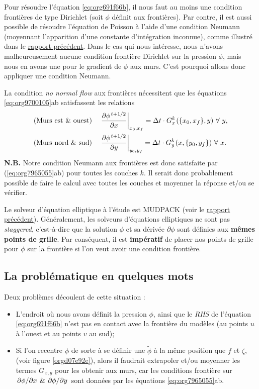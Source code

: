 \documentclass[10pt]{report}
\numberwithin{equation}{section}
\newcommand{\pt}{\hspace{1pt}} %
\begin{document}
Pour résoudre l'équation \ref{eq:org691f66b}, il nous faut au moins une condition frontières de type Dirichlet (soit \(\phi\) définit aux frontières).
Par contre, il est aussi possible de résoudre l'équation de Poisson à l'aide d'une condition Neumann (moyennant l'apparition d'une constante d'intégration inconnue), comme illustré dans le \href{rapport-2023-04-21.org}{rapport précédent}.
Dans le cas qui nous intéresse, nous n'avons malheureusement aucune condition frontière Dirichlet sur la pression \(\phi\), mais nous en avons une pour le gradient de \(\phi\) aux murs.
C'est pourquoi allons donc appliquer une condition Neumann.\bigskip

La condition \emph{no normal flow} aux frontières nécessitent que les équations \ref{eq:org9700105}ab satisfassent les relations
\begin{subequations}
\label{eq:org7965055}
\begin{align}
&& &\text{(Murs est \& ouest)}
&&\eval{\pdv{\phi^{\pt t+1/2}}{x}}_{x_0,x_f} =  \Delta t\cdot G^k_x\pt (\{x_0,x_f\},y)\ \forall\ y,&&\\
&& &\text{(Murs nord \& sud)}
&&\eval{\pdv{\phi^{\pt t+1/2}}{y}}_{y_0,y_f} =  \Delta t\cdot G^k_y\pt (x,\{y_0,y_f\})\ \forall\ x.&&
\end{align}
\end{subequations}
\textbf{N.B.} Notre condition Neumann aux frontières est donc satisfaite par (\ref{eq:org7965055}ab) pour toutes les couches \(k\).
Il serait donc probablement possible de faire le calcul avec toutes les couches et moyenner la réponse et/ou se vérifier.\bigskip

Le solveur d'équation elliptique à l'étude est MUDPACK (voir le \href{rapport-2023-04-21.org}{rapport précédent}).
Généralement, les solveurs d'équations elliptiques ne sont pas \emph{staggered}, c'est-à-dire que la solution \(\phi\) et sa dérivée \(\partial\phi\) sont définies aux \textbf{mêmes points de grille}.
Par conséquent, il est \textbf{impératif} de placer nos points de grille pour \(\phi\) sur la frontière si l'on veut avoir une condition frontière.

\subsection{La problématique en quelques mots}
\label{sec:org8970f19}

Deux problèmes découlent de cette situation :
\begin{itemize}
\item L'endroit où nous avons définit la pression \(\phi\), ainsi que le \emph{RHS} de l'équation \ref{eq:org691f66b} n'est pas en contact avec la frontière du modèles (au points \(u\) à l'ouest et au points \(v\) au sud);
\item Si l'on recentre \(\phi\) de sorte à se définir une \(\tilde{\phi}\) à la même position que \(f\) et \(\zeta\), (voir figure \ref{orgd07e92e}), alors il faudrait extrapoler et/ou moyenner les termes \(G_{\pt x,y}\) pour les obtenir aux murs, car les conditions frontière sur \(\pdv*{\phi}{x}\pt \& \pt \pdv*{\phi}{y}\) sont données par les équations \ref{eq:org7965055}ab.
\end{itemize}
\end{document}
